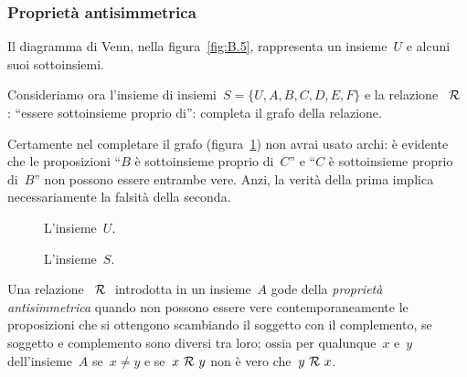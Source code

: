 
\subsubsection{Proprietà antisimmetrica}

 \begin{esempio}

Il diagramma di Venn, nella figura~\ref{fig:B.5}, rappresenta un 
insieme~\(U\) 
e 
alcuni suoi sottoinsiemi.

Consideriamo ora l'insieme di insiemi~\(S = \lbrace U, A, B, C, D, E, F 
\rbrace\) 
e la relazione~\(~\mathcal{R}~\): ``essere sottoinsieme proprio di'':
completa il grafo della relazione.

Certamente nel completare il grafo (figura~\ref{fig:B.6}) non avrai usato 
archi: 
è evidente che le proposizioni ``\(B\) è sottoinsieme proprio di~\(C\)'' e 
``\(C\)
è sottoinsieme proprio di~\(B\)'' non possono essere entrambe vere. Anzi, la 
verità della prima implica necessariamente la falsità della seconda.
 \end{esempio}

\begin{inaccessibleblock}
 \begin{figure}[b]
\begin{minipage}[b]{.45\textwidth}
%  
\begin{center} \sottoinsiemi \end{center}
 \caption{L'insieme~\(U\).}\label{fig:B.5}
\end{minipage}\hfil
\begin{minipage}[b]{.45\textwidth}
\begin{center} \relsottoinsieme \end{center}
%  
 \caption{L'insieme~\(S\).}\label{fig:B.6}
\end{minipage}
\end{figure}
\end{inaccessibleblock}

\begin{definizione}
Una relazione~\(~\mathcal{R}~\) introdotta in un insieme~\(A\) gode della 
\emph{proprietà 
antisimmetrica} quando non possono essere vere
contemporaneamente le proposizioni che si ottengono scambiando il soggetto 
con 
il complemento, se soggetto e complemento sono diversi
tra loro; ossia per qualunque~\(x\) e~\(y\) dell'insieme~\(A\) se~\(x \neq 
y\) 
e 
se~\(x 
~\mathcal{R}~ y\) non è vero che~\(y ~\mathcal{R}~ x\).
\end{definizione}

